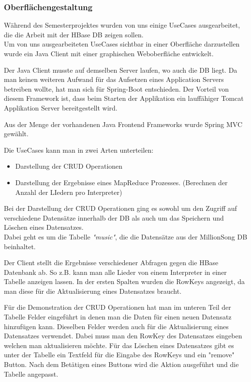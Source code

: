\subsubsection{Oberflächengestaltung}

Während des Semesterprojektes wurden von uns einige UseCases ausgearbeitet, die die Arbeit mit der HBase DB zeigen sollen.\\
Um von uns ausgearbeiteten UseCases sichtbar in einer Oberfläche darzustellen wurde ein Java Client mit einer graphischen Weboberfläche entwickelt.

Der Java Client musste auf demselben Server laufen, wo auch die DB liegt. Da man keinen weiteren Aufwand für das Aufsetzen eines Application Servers betreiben wollte, hat man sich für Spring-Boot entschieden. Der Vorteil von diesem Framework ist, dass beim Starten der Applikation ein lauffähiger Tomcat Applikation Server bereitgestellt wird. 

Aus der Menge der vorhandenen Java Frontend Frameworks wurde Spring MVC gewählt.  

Die UseCases kann man in zwei Arten unterteilen:\\
\begin{itemize}
\item Darstellung der CRUD Operationen
\item Darstellung der Ergebnisse eines MapReduce Prozesses. (Berechnen der Anzahl der LIedern pro Interpreter)
\end{itemize}
Bei der Darstellung der CRUD Operationen ging es sowohl um den Zugriff auf verschiedene Datensätze innerhalb der DB als auch um das Speichern und Löschen eines Datensatzes.\\
Dabei geht es um die Tabelle \textit{"music"}, die die Datensätze aus der MillionSong DB beinhaltet.

Der Client stellt die Ergebnisse verschiedener Abfragen gegen die HBase Datenbank ab. So z.B. kann man alle Lieder von einem Interpreter in einer Tabelle anzeigen lassen. In der ersten Spalten wurden die RowKeys angezeigt, da man diese für die Aktualisierung eines Datensatzes braucht.

Für die Demonstration der CRUD Operationen hat man im unteren Teil der Tabelle Felder eingeführt in denen man die Daten für einen neuen Datensatz hinzufügen kann. Dieselben Felder werden auch für die Aktualisierung eines Datensatzes verwendet. Dabei muss man den RowKey des Datensatzes eingeben welchen man aktualisieren möchte.
Für das Löschen eines Datensatzes gibt es unter der Tabelle ein Textfeld für die Eingabe des RowKeys und ein "remove" Button. Nach dem Betätigen eines Buttons wird die Aktion ausgeführt und die Tabelle angepasst.

